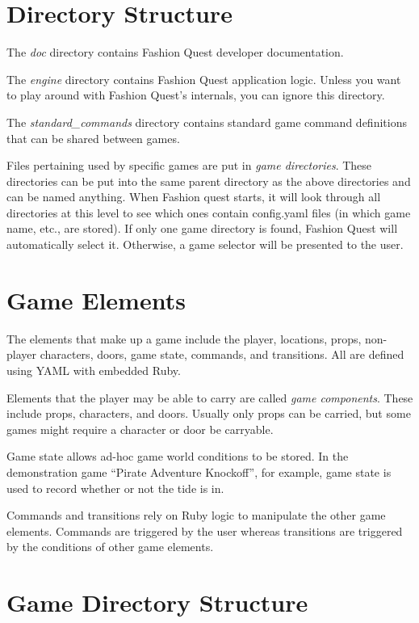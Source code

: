 \documentclass[letterpaper,10pt,english]{manual}
\begin{document}
\section{Directory Structure}

The \emph{doc} directory contains Fashion Quest developer documentation.

The \emph{engine} directory contains Fashion Quest application logic. Unless you want to play around with Fashion Quest's internals, you can ignore this directory.

The \emph{standard\_commands} directory contains standard game command definitions that can be shared between games.

Files pertaining used by specific games are put in \emph{game directories}. These directories can be put into the same parent directory as the above directories and can be named anything. When Fashion quest starts, it will look through all directories at this level to see which ones contain config.yaml files (in which game name, etc., are stored). If only one game directory is found, Fashion Quest will automatically select it. Otherwise, a game selector will be presented to the user.


\section{Game Elements}

The elements that make up a game include the player, locations, props, non-player characters, doors, game state, commands, and transitions. All are defined using YAML with embedded Ruby.

Elements that the player may be able to carry are called \emph{game components}. These include props, characters, and doors. Usually only props can be carried, but some games might require a character or door be carryable.

Game state allows ad-hoc game world conditions to be stored. In the demonstration game ``Pirate Adventure Knockoff'', for example, game state is used to record whether or not the tide is in.

Commands and transitions rely on Ruby logic to manipulate the other game elements. Commands are triggered by the user whereas transitions are triggered by the conditions of other game elements.


\section{Game Directory Structure}
\end{document}
